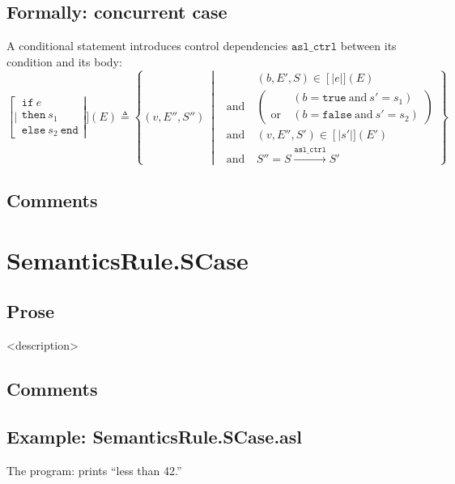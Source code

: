 \documentclass{book}
\newcommand\syntt[1]{\mathtt{#1}}
\newcommand\llbracket{[|}
\newcommand\rrbracket{|]}
\newcommand\interp[1]{\left\llbracket #1 \right\rrbracket}
\newcommand\st[0]{\ \middle|\ }
\newcommand\aslctrl[0]{\mathtt{asl\_ctrl}}
\begin{document}
  \subsection{Formally: concurrent case}
  A conditional statement introduces control dependencies $\aslctrl$ between its
  condition and its body:
  \begin{equation}
    \interp{\begin{array}{l}
      \syntt{if}\ e\\
      \syntt{then}\ s_1\\
      \syntt{else}\ s_2\ \syntt{end}
    \end{array}} (E) \triangleq
      \left\{ (v, E'', S'') \st{} \ 
      \begin{aligned}
        & (b, E', S) \in \interp{e} (E)
        \\ \text{and}\ &
        \left( \begin{aligned}
          & \left(b = \syntt{true}\ \text{and}\ s' = s_1 \right)
          \\ \text{or}\ &
          \left( b = \syntt{false}\ \text{and}\ s' = s_2 \right)
        \end{aligned} \right)
        \\ \text{and}\ &
        (v, E'', S') \in \interp{s'} (E')
        \\ \text{and}\ &
        S'' = S \xrightarrow{\aslctrl} S'
      \end{aligned}
      \right\}
    \label{eq:sem-conc-scond}
  \end{equation}

  \subsection{Comments}

\section{SemanticsRule.SCase \label{sec:SemanticsRule.SCase}}

    \subsection{Prose}
    <description>

    \subsection{Comments}

    \subsection{Example: SemanticsRule.SCase.asl}
    The program:
    prints ``less than 42.''
\end{document}
